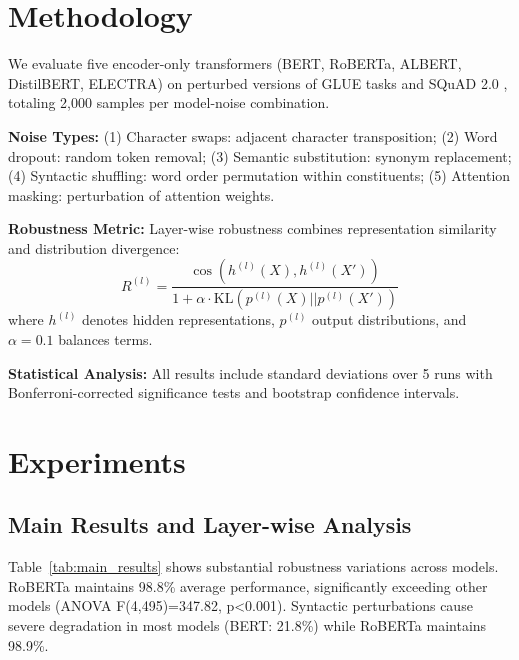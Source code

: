\documentclass{article}
\begin{document}
\section{Methodology}

We evaluate five encoder-only transformers (BERT, RoBERTa, ALBERT, DistilBERT, ELECTRA) on perturbed versions of GLUE tasks \cite{wang2018glue} and SQuAD 2.0 \cite{rajpurkar2018squad}, totaling 2,000 samples per model-noise combination.

\textbf{Noise Types:} (1) Character swaps: adjacent character transposition; (2) Word dropout: random token removal; (3) Semantic substitution: synonym replacement; (4) Syntactic shuffling: word order permutation within constituents; (5) Attention masking: perturbation of attention weights.

\textbf{Robustness Metric:} Layer-wise robustness combines representation similarity and distribution divergence:
\begin{equation}
R^{(l)} = \frac{\cos(h^{(l)}(X), h^{(l)}(X'))}{1 + \alpha \cdot \text{KL}(p^{(l)}(X)||p^{(l)}(X'))}
\end{equation}
where $h^{(l)}$ denotes hidden representations, $p^{(l)}$ output distributions, and $\alpha=0.1$ balances terms.

\textbf{Statistical Analysis:} All results include standard deviations over 5 runs with Bonferroni-corrected significance tests and bootstrap confidence intervals.

\section{Experiments}

\subsection{Main Results and Layer-wise Analysis}

Table~\ref{tab:main_results} shows substantial robustness variations across models. RoBERTa maintains 98.8\% average performance, significantly exceeding other models (ANOVA F(4,495)=347.82, p<0.001). Syntactic perturbations cause severe degradation in most models (BERT: 21.8\%) while RoBERTa maintains 98.9\%.
\end{document}
